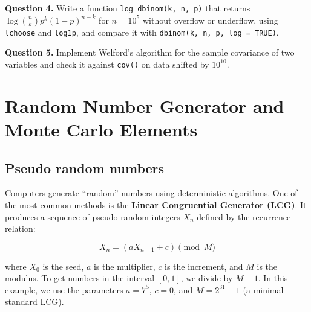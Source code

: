\documentclass[
  letterpaper,
  DIV=11,
  numbers=noendperiod]{scrreprt}
\begin{document}
\textbf{Question 4.} Write a function \texttt{log\_dbinom(k,\ n,\ p)}
that returns \(\log\binom{n}{k}p^k(1-p)^{n-k}\) for \(n = 10^5\) without
overflow or underflow, using \texttt{lchoose} and \texttt{log1p}, and
compare it with \texttt{dbinom(k,\ n,\ p,\ log\ =\ TRUE)}.

\textbf{Question 5.} Implement Welford's algorithm for the sample
covariance of two variables and check it against \texttt{cov()} on data
shifted by \(10^{10}\).


\chapter{Random Number Generator and Monte Carlo
Elements}\label{random-number-generator-and-monte-carlo-elements}

\section{Pseudo random numbers}\label{pseudo-random-numbers}

Computers generate ``random'' numbers using deterministic algorithms.
One of the most common methods is the \textbf{Linear Congruential
Generator (LCG)}. It produces a sequence of pseudo-random integers
\(X_n\) defined by the recurrence relation:

\[
X_n = (a X_{n-1} + c) \pmod M
\]

where \(X_0\) is the seed, \(a\) is the multiplier, \(c\) is the
increment, and \(M\) is the modulus. To get numbers in the interval
\([0,1]\), we divide by \(M-1\). In this example, we use the parameters
\(a = 7^5\), \(c = 0\), and \(M = 2^{31}-1\) (a minimal standard LCG).
\end{document}
